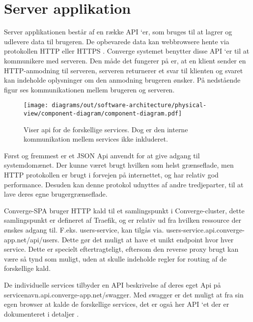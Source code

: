 \section{Server applikation}

Server applikationen består af en række API ‘er, som bruges til at lagrer og udlevere data til brugeren. De opbevarede data kan webbrowsere hente via protokollen HTTP eller HTTPS \cite[HTTP]{converge-terms} . Converge systemet benytter disse API ‘er til at kommunikere med serveren. Den måde det fungerer på er, at en klient sender en HTTP-anmodning til serveren, serveren returnerer et svar til klienten og svaret kan indeholde oplysninger om den anmodning brugeren ønsker. På nedstående figur ses kommunikationen mellem brugeren og serveren.

\begin{figure}[H]
    \centering
  \texttt{[image: diagrams/out/software-architecture/physical-view/component-diagram/component-diagram.pdf]}
  \caption{Viser api for de forskellige services. Dog er den interne kommunikation mellem services ikke inkluderet.}
  \label{fig:component-api}
  \end{figure}

Først og fremmest er et JSON Api anvendt for at give adgang til systemdomænet. Der kunne været brugt hvilken som helst grænseflade, men HTTP protokollen er brugt i forvejen på internettet, og har relativ god performance. Desuden kan denne protokol udnyttes af andre tredjeparter, til at lave deres egne brugergrænseflade.

Converge-SPA bruger HTTP kald til et samlingspunkt i Converge-cluster, dette samlingspunkt er defineret af Traefik, og er relativ ud fra hvilken ressource der ønskes adgang til. F.eks. users-service, kan tilgås via. users-service.api.converge-app.net/api/users. Dette gør det muligt at have et unikt endpoint hvor hver service. Dette er specielt eftertragteligt, eftersom den reverse proxy brugt kan være så tynd som muligt, uden at skulle indeholde regler for routing af de forskellige kald.

De individuelle services tilbyder en API beskrivelse af deres eget Api på servicenavn.api.converge-app.net/swagger. Med swagger er det muligt at fra sin egen browser at kalde de forskellige services, det er også her API ‘et der er dokumenteret i detaljer \cite{swagger}.